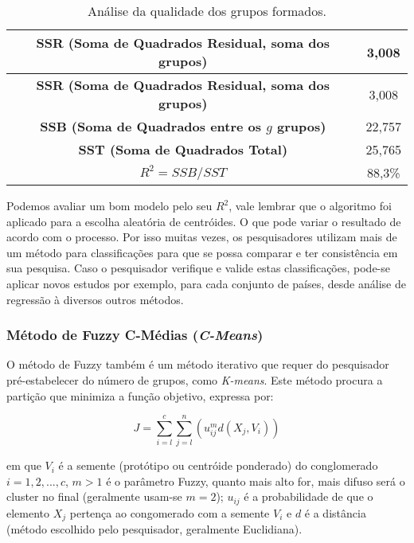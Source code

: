\documentclass[
]{book}
\begin{document}
\begin{longtable}[]{@{}cc@{}}
\caption{\label{tab:exkmeans3} Análise da qualidade dos grupos formados.}\tabularnewline
\toprule
\textbf{SSR (Soma de Quadrados Residual, soma dos grupos)} & 3,008\tabularnewline
\midrule
\endfirsthead
\toprule
\textbf{SSR (Soma de Quadrados Residual, soma dos grupos)} & 3,008\tabularnewline
\midrule
\endhead
\textbf{SSB (Soma de Quadrados entre os \(g\) grupos)} & 22,757\tabularnewline
\textbf{SST (Soma de Quadrados Total)} & 25,765\tabularnewline
\textbf{\(R^2=SSB/SST\)} & 88,3\%\tabularnewline
\bottomrule
\end{longtable}

Podemos avaliar um bom modelo pelo seu \(R^2\), vale lembrar que o algoritmo foi aplicado para a escolha aleatória de centróides. O que pode variar o resultado de acordo com o processo. Por isso muitas vezes, os pesquisadores utilizam mais de um método para classificações para que se possa comparar e ter consistência em sua pesquisa. Caso o pesquisador verifique e valide estas classificações, pode-se aplicar novos estudos por exemplo, para cada conjunto de países, desde análise de regressão à diversos outros métodos.

\hypertarget{muxe9todo-de-fuzzy-c-muxe9dias-c-means}{%
\subsubsection{\texorpdfstring{Método de Fuzzy C-Médias (\emph{C-Means})}{Método de Fuzzy C-Médias (C-Means)}}\label{muxe9todo-de-fuzzy-c-muxe9dias-c-means}}

O método de Fuzzy \citep{bezdek1981objective} também é um método iterativo que requer do pesquisador pré-estabelecer do número de grupos, como \emph{K-means}. Este método procura a partição que minimiza a função objetivo, expressa por:

\begin{equation}
J=\displaystyle \sum^c_{i=l} \sum^n_{j=l} (u_{ij}^m d(X_j,V_i))
 \label{eq:cmeansobjetivo}
\end{equation}

em que \(V_i\) é a semente (protótipo ou centróide ponderado) do conglomerado \(i=1,2,...,c\), \(m>1\) é o parâmetro Fuzzy, quanto mais alto for, mais difuso será o cluster no final (geralmente usam-se \(m=2\)); \(u_{ij}\) é a probabilidade de que o elemento \(X_j\) pertença ao congomerado com a semente \(V_i\) e \(d\) é a distância (método escolhido pelo pesquisador, geralmente Euclidiana).
\end{document}
